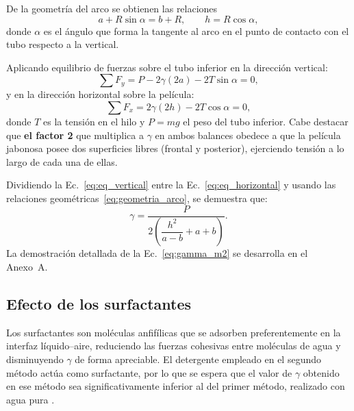 De la geometría del arco se obtienen las relaciones
\begin{equation}
    a + R\sin\alpha = b + R, \qquad h = R\cos\alpha,
    \label{eq:geometria_arco}
\end{equation}
donde $\alpha$ es el ángulo que forma la tangente al arco en el punto de
contacto con el tubo respecto a la vertical.

Aplicando equilibrio de fuerzas sobre el tubo inferior en la dirección
vertical:
\begin{equation}
    \sum F_y = P - 2\gamma(2a) - 2T\sin\alpha = 0,
    \label{eq:eq_vertical}
\end{equation}
y en la dirección horizontal sobre la película:
\begin{equation}
    \sum F_x = 2\gamma(2h) - 2T\cos\alpha = 0,
    \label{eq:eq_horizontal}
\end{equation}
donde $T$ es la tensión en el hilo y $P = mg$ el peso del tubo inferior. Cabe destacar que \textbf{el factor 2} que multiplica a $\gamma$ en ambos balances obedece a que la película jabonosa posee dos superficies libres (frontal y posterior), ejerciendo tensión a lo largo de cada una de ellas.

Dividiendo la Ec.~\eqref{eq:eq_vertical} entre la
Ec.~\eqref{eq:eq_horizontal} y usando las relaciones
geométricas~\eqref{eq:geometria_arco}, se demuestra que:
\begin{equation}
    \gamma = \frac{P}{2 \left( \dfrac{h^{2}}{a - b} + a + b \right)}.
    \label{eq:gamma_m2}
\end{equation}
La demostración detallada de la Ec.~\eqref{eq:gamma_m2} se desarrolla en el
Anexo~A.

\subsection{Efecto de los surfactantes}

Los surfactantes son moléculas anfifílicas que se adsorben preferentemente en
la interfaz líquido--aire, reduciendo las fuerzas cohesivas entre moléculas de
agua y disminuyendo $\gamma$ de forma apreciable. El detergente empleado en el
segundo método actúa como surfactante, por lo que se espera que el valor de
$\gamma$ obtenido en ese método sea significativamente inferior al del primer
método, realizado con agua pura \cite{serway}.